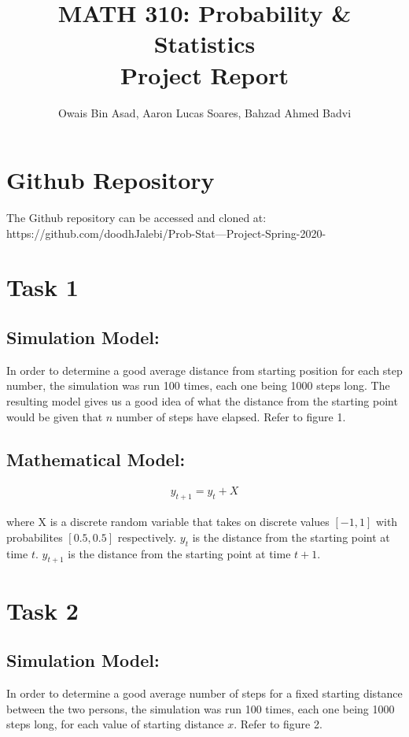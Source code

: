 \documentclass[10pt, a4paper]{article}
\begin{document}
    
\title{MATH 310: Probability \& Statistics \\Project Report}
\author{Owais Bin Asad, Aaron Lucas Soares, Bahzad Ahmed Badvi}

\maketitle

\section*{Github Repository}
The Github repository can be accessed and cloned at: https://github.com/doodhJalebi/Prob-Stat---Project-Spring-2020-

\section*{Task 1}
\subsection*{Simulation Model:}
In order to determine a good average distance from starting position for each step number, the simulation was run
100 times, each one being 1000 steps long. The resulting model gives us a good idea of what the
distance from the starting point would be given that $n$ number of steps have elapsed. Refer to figure 1.

\subsection*{Mathematical Model:}
\begin{align*}
    y_{t+1} = y_{t} + X
\end{align*}

where X is a discrete random variable that takes on discrete values $[-1, 1]$ with probabilites $[0.5, 0.5]$ respectively.
$y_t$ is the distance from the starting point at time $t$. $y_{t+1}$ is the distance from the starting point at time $t+1$.


\section*{Task 2}
\subsection*{Simulation Model:}
In order to determine a good average number of steps for a fixed starting distance between the two persons, the simulation was run
100 times, each one being 1000 steps long, for each value of starting distance $x$. Refer to figure 2.
\end{document}
